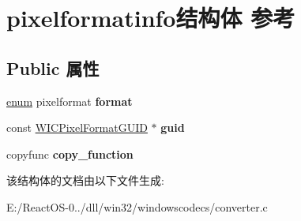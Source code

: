 \hypertarget{structpixelformatinfo}{}\section{pixelformatinfo结构体 参考}
\label{structpixelformatinfo}
\subsection*{Public 属性}
\begin{DoxyCompactItemize}
\item 
\mbox{\label{structpixelformatinfo_a19489694875de24feb071afdda1436d4}} 
\hyperlink{interfaceenum}{enum} pixelformat {\bfseries format}
\item 
\mbox{\label{structpixelformatinfo_ab1215d439f5a7bcddb8eee222fa3f5a7}} 
const \hyperlink{interface_g_u_i_d}{W\+I\+C\+Pixel\+Format\+G\+U\+ID} $\ast$ {\bfseries guid}
\item 
\mbox{\label{structpixelformatinfo_a654e2fb89df3a2e24d5315897e46e1b5}} 
copyfunc {\bfseries copy\+\_\+function}
\end{DoxyCompactItemize}


该结构体的文档由以下文件生成\+:\begin{DoxyCompactItemize}
\item 
E\+:/\+React\+O\+S-\/0../dll/win32/windowscodecs/converter.\+c\end{DoxyCompactItemize}
